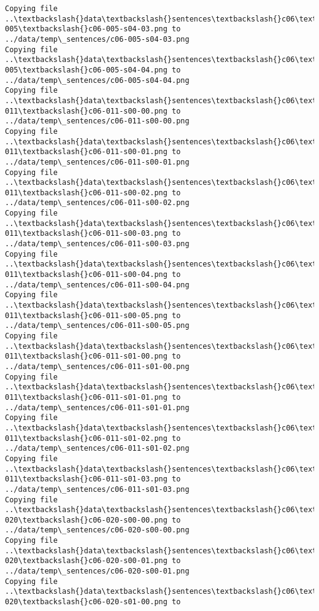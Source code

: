 \documentclass[11pt]{article}
\begin{document}
\begin{Verbatim}[commandchars=\\\{\}]
Copying file ..\textbackslash{}data\textbackslash{}sentences\textbackslash{}c06\textbackslash{}c06-005\textbackslash{}c06-005-s04-03.png to
../data/temp\_sentences/c06-005-s04-03.png
Copying file ..\textbackslash{}data\textbackslash{}sentences\textbackslash{}c06\textbackslash{}c06-005\textbackslash{}c06-005-s04-04.png to
../data/temp\_sentences/c06-005-s04-04.png
Copying file ..\textbackslash{}data\textbackslash{}sentences\textbackslash{}c06\textbackslash{}c06-011\textbackslash{}c06-011-s00-00.png to
../data/temp\_sentences/c06-011-s00-00.png
Copying file ..\textbackslash{}data\textbackslash{}sentences\textbackslash{}c06\textbackslash{}c06-011\textbackslash{}c06-011-s00-01.png to
../data/temp\_sentences/c06-011-s00-01.png
Copying file ..\textbackslash{}data\textbackslash{}sentences\textbackslash{}c06\textbackslash{}c06-011\textbackslash{}c06-011-s00-02.png to
../data/temp\_sentences/c06-011-s00-02.png
Copying file ..\textbackslash{}data\textbackslash{}sentences\textbackslash{}c06\textbackslash{}c06-011\textbackslash{}c06-011-s00-03.png to
../data/temp\_sentences/c06-011-s00-03.png
Copying file ..\textbackslash{}data\textbackslash{}sentences\textbackslash{}c06\textbackslash{}c06-011\textbackslash{}c06-011-s00-04.png to
../data/temp\_sentences/c06-011-s00-04.png
Copying file ..\textbackslash{}data\textbackslash{}sentences\textbackslash{}c06\textbackslash{}c06-011\textbackslash{}c06-011-s00-05.png to
../data/temp\_sentences/c06-011-s00-05.png
Copying file ..\textbackslash{}data\textbackslash{}sentences\textbackslash{}c06\textbackslash{}c06-011\textbackslash{}c06-011-s01-00.png to
../data/temp\_sentences/c06-011-s01-00.png
Copying file ..\textbackslash{}data\textbackslash{}sentences\textbackslash{}c06\textbackslash{}c06-011\textbackslash{}c06-011-s01-01.png to
../data/temp\_sentences/c06-011-s01-01.png
Copying file ..\textbackslash{}data\textbackslash{}sentences\textbackslash{}c06\textbackslash{}c06-011\textbackslash{}c06-011-s01-02.png to
../data/temp\_sentences/c06-011-s01-02.png
Copying file ..\textbackslash{}data\textbackslash{}sentences\textbackslash{}c06\textbackslash{}c06-011\textbackslash{}c06-011-s01-03.png to
../data/temp\_sentences/c06-011-s01-03.png
Copying file ..\textbackslash{}data\textbackslash{}sentences\textbackslash{}c06\textbackslash{}c06-020\textbackslash{}c06-020-s00-00.png to
../data/temp\_sentences/c06-020-s00-00.png
Copying file ..\textbackslash{}data\textbackslash{}sentences\textbackslash{}c06\textbackslash{}c06-020\textbackslash{}c06-020-s00-01.png to
../data/temp\_sentences/c06-020-s00-01.png
Copying file ..\textbackslash{}data\textbackslash{}sentences\textbackslash{}c06\textbackslash{}c06-020\textbackslash{}c06-020-s01-00.png to

\end{Verbatim}
\end{document}
